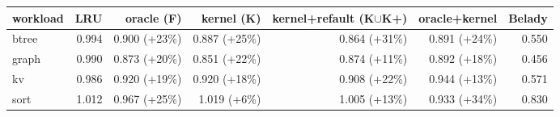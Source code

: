 \begin{tabular}{lrrrrrr}
\toprule
workload & LRU & oracle (F) & kernel (K) & kernel{+}refault (K$\cup$K{+}) & oracle{+}kernel & Belady \\
\midrule
btree & 0.994 & 0.900 ({+}23\%) & 0.887 ({+}25\%) & 0.864 ({+}31\%) & 0.891 ({+}24\%) & 0.550 \\
graph & 0.990 & 0.873 ({+}20\%) & 0.851 ({+}22\%) & 0.874 ({+}11\%) & 0.892 ({+}18\%) & 0.456 \\
kv & 0.986 & 0.920 ({+}19\%) & 0.920 ({+}18\%) & 0.908 ({+}22\%) & 0.944 ({+}13\%) & 0.571 \\
sort & 1.012 & 0.967 ({+}25\%) & 1.019 ({+}6\%) & 1.005 ({+}13\%) & 0.933 ({+}34\%) & 0.830 \\
\bottomrule
\end{tabular}
